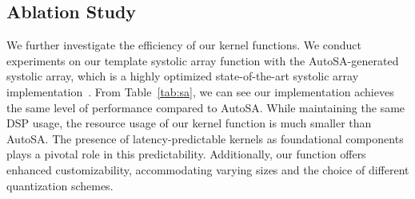 \subsection{Ablation Study}
\label{sub:ablation}

We further investigate the efficiency of our kernel functions.
We conduct experiments on our template systolic array function with the AutoSA-generated systolic array, which is a highly optimized state-of-the-art systolic array implementation~\cite{wang2021autosa}.
From Table~\ref{tab:sa}, we can see our implementation achieves the same level of performance compared to AutoSA.
While maintaining the same DSP usage, the resource usage of our kernel function is much smaller than AutoSA.
The presence of latency-predictable kernels as foundational components plays a pivotal role in this predictability.
Additionally, our function offers enhanced customizability, accommodating varying sizes and the choice of different quantization schemes.


